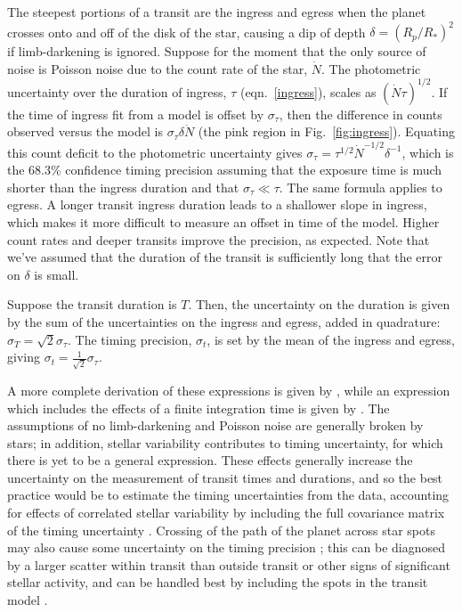 \documentclass[graybox,natbib,nosecnum]{svmult}
\begin{document}
The steepest portions of a transit are the ingress and egress when the planet crosses onto and
off of the disk of the star, causing a dip of depth $\delta = (R_p/R_*)^2$ if limb-darkening is ignored.   
Suppose for the moment that the only source of noise is Poisson noise due to the count rate of 
the star, $\dot N$.  The photometric uncertainty over the duration of ingress, $\tau$ (eqn.\ \ref{ingress}), 
scales as $(\dot N \tau)^{1/2}$.  If the time of 
ingress fit from a model is offset by $\sigma_\tau$, then the difference in counts observed
versus the model is $\sigma_\tau \delta \dot N$ (the pink region in Fig.\ \ref{fig:ingress}).  Equating 
this count deficit to the photometric uncertainty gives $\sigma_\tau = \tau^{1/2} \dot N^{-1/2} \delta^{-1}$, which
is the 68.3\% confidence timing precision assuming that the exposure time is much shorter than the
ingress duration and that $\sigma_\tau \ll \tau$.  The same formula applies to egress. A longer transit 
ingress duration leads to a shallower slope in ingress, which makes it more difficult to measure an 
offset in time of the model.  Higher count rates and deeper transits improve the precision, as 
expected.  Note that we've assumed that the duration of the transit is sufficiently long that the 
error on $\delta$ is small.

Suppose the transit duration is $T$.  Then, the uncertainty on the duration is given by
the sum of the uncertainties on the ingress and egress, added in quadrature:
$\sigma_T = \sqrt{2} \sigma_\tau$.  The timing precision, $\sigma_t$, is set by the mean of the ingress
and egress, giving $\sigma_t = \frac{1}{\sqrt{2}} \sigma_\tau$.

A more complete derivation of these expressions is given by \citet{2008ApJ...689..499C}, while an 
expression which includes the effects of a finite integration time is given by \citet{2014ApJ...794...92P}.
The assumptions of no limb-darkening and Poisson noise are generally broken by stars;  in addition,
stellar variability contributes to timing uncertainty, for which there is yet to be a general
expression.  These effects generally increase the uncertainty on the measurement of transit times
and durations, and so the best practice would be to estimate the timing uncertainties from the
data, accounting for effects of correlated stellar variability by including the full covariance
matrix of the timing uncertainty \citep{2009ApJ...704...51C,2012MNRAS.419.2683G,ForemanMackey2017}.  Crossing of
the path of the planet across star spots may also cause some uncertainty on the timing precision 
\citep{2013A&A...556A..19O,2013MNRAS.430.3032B};
this can be diagnosed by a larger scatter within transit than outside transit or other signs of
significant stellar activity, and can be handled best by including the spots in the transit model 
\citep{2016A&A...585A..72I}.
\end{document}
